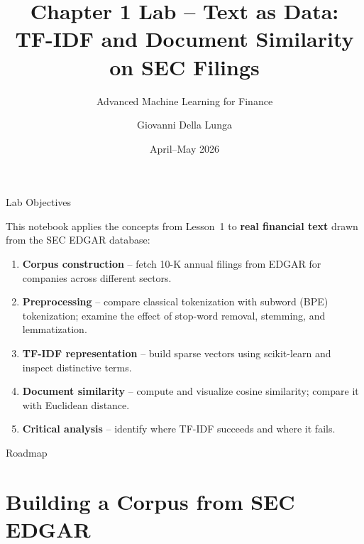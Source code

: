 \documentclass[aspectratio=169,11pt]{beamer}
\title[Chapter 1 -- Lab Session]{%
  Chapter 1 Lab -- Text as Data:\\
  TF-IDF and Document Similarity on SEC Filings}
\subtitle{Advanced Machine Learning for Finance}
\author{Giovanni Della Lunga}
\institute{University of Bologna}
\date{April--May 2026}
\begin{document}
\begin{frame}
\titlepage
\end{frame}

\begin{frame}{Lab Objectives}

This notebook applies the concepts from Lesson~1 to
\textbf{real financial text} drawn from the SEC EDGAR database:

\begin{enumerate}
  \item \textbf{Corpus construction} -- fetch 10-K annual filings
        from EDGAR for companies across different sectors.
  \item \textbf{Preprocessing} -- compare classical tokenization with
        subword (BPE) tokenization; examine the effect of stop-word
        removal, stemming, and lemmatization.
  \item \textbf{TF-IDF representation} -- build sparse vectors
        using scikit-learn and inspect distinctive terms.
  \item \textbf{Document similarity} -- compute and visualize cosine
        similarity; compare it with Euclidean distance.
  \item \textbf{Critical analysis} -- identify where TF-IDF succeeds
        and where it fails.
\end{enumerate}

\end{frame}

\begin{frame}{Roadmap}
\tableofcontents
\end{frame}

\section{Building a Corpus from SEC EDGAR}
\end{document}
